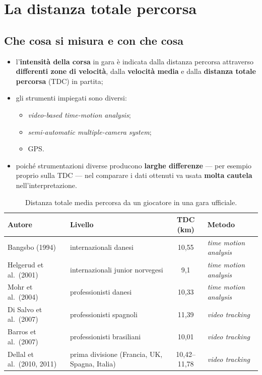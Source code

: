 \section{La distanza totale percorsa}

\subsection{Che cosa si misura e con che cosa}

\begin{itemize}
  \item l'\textbf{intensità della corsa} in gara è indicata dalla distanza percorsa attraverso
    \textbf{differenti zone di velocità}, dalla \textbf{velocità media} e dalla \textbf{distanza
    totale percorsa} (TDC) in partita;
  \item gli strumenti impiegati sono diversi:
    \begin{itemize}
      \item \textit{video-based time-motion analysis};
      \item \textit{semi-automatic multiple-camera system};
      \item GPS.
    \end{itemize}
  \item poiché strumentazioni diverse producono \textbf{larghe differenze} --- per esempio proprio
    sulla TDC --- nel comparare i dati ottenuti va usata \textbf{molta cautela}
    nell'interpretazione.
\end{itemize}

\begin{table}[htbp]
  \centering
  \small
  \renewcommand{\arraystretch}{1.3}
  \begin{tabularx}{\textwidth}{|l|X|c|X|}
    \hline
    \textbf{Autore} & \textbf{Livello} & \textbf{TDC (km)} & \textbf{Metodo} \\
    \hline
    Bangsbo (1994) & internazionali danesi & 10,55 & \textit{time motion analysis} \\
    \hline
    Helgerud et al.\ (2001) & internazionali junior norvegesi & 9,1 & \textit{time motion analysis} \\
    \hline
    Mohr et al.\ (2004) & professionisti danesi & 10,33 & \textit{time motion analysis} \\
    \hline
    Di Salvo et al.\ (2007) & professionisti spagnoli & 11,39 & \textit{video tracking} \\
    \hline
    Barros et al.\ (2007) & professionisti brasiliani & 10,01 & \textit{video tracking} \\
    \hline
    Dellal et al.\ (2010, 2011) & prima divisione (Francia, UK, Spagna, Italia) & 10,42--11,78 &
      \textit{video tracking} \\
    \hline
  \end{tabularx}
  \caption*{Distanza totale media percorsa da un giocatore in una gara ufficiale.}
\end{table}

